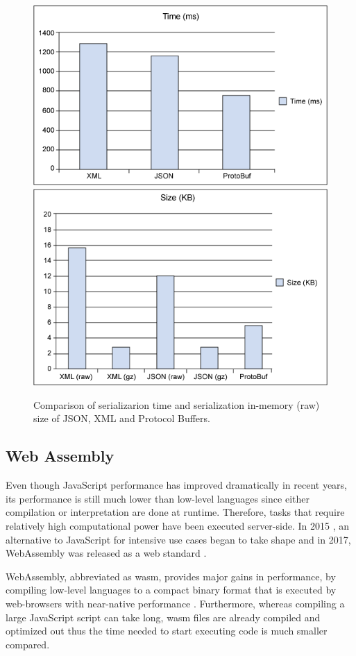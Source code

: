 \begin{enumerate}[a)]
	\begin{figure}[h!]
		\centering
    	\includegraphics[width=0.45\linewidth]{assets/images/protobuff-json-xml_rw.png}
    	\includegraphics[width=0.45\linewidth]{assets/images/protobuff-json-xml_size.png}
    	\caption{Comparison of serializarion time and serialization in-memory (raw) size of JSON, XML and Protocol Buffers. 		\cite{protobuff_json_xml}}
    	\label{fig:protobuff_json_xml}
	\end{figure}
	
 \end{enumerate}



\subsection{Web Assembly}
Even though JavaScript performance has improved dramatically in recent years, its performance is still much lower than low-level languages since either compilation or interpretation are done at runtime. Therefore, tasks that require relatively high computational power have been executed server-side. In 2015 \cite{wasm-roadmap}, an alternative to JavaScript for intensive use cases began to take shape and in 2017, WebAssembly \cite{webassembly-announcement} was released as a web standard \cite{w3c-wasm}. 

WebAssembly, abbreviated as wasm, provides major gains in performance, by compiling low-level languages to a compact binary format that is executed by web-browsers with near-native performance \cite{wasm-concepts}. Furthermore, whereas compiling a large JavaScript script can take long, wasm files are already compiled and optimized out thus the time needed to start executing code is much smaller compared. 


